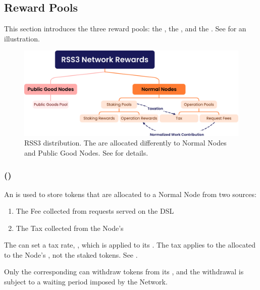 \subsection{Reward Pools}
\label{subsec:reward_pools}

This section introduces the three reward pools: the , the , and the . See  for an illustration.

    {
        \begin{figure}[tb!]
            \centering
            \includegraphics[width=\columnwidth]{figures/network-rewards.png}
            \caption{RSS3  distribution.
                The  are allocated differently to Normal Nodes and Public Good Nodes.
                See  for details.}
            \label{fig:network-rewards}
        \end{figure}
    }

\subsubsection{ (\operationPool)}
\label{subsubsec:operation_pool}

An  is used to store tokens that are allocated to a Normal Node from two sources:
\begin{enumerate}
    \item The \gls{Fee} collected from requests served on the \gls{DSL}
    \item The \gls{Tax} collected from the Node's \stakingPool
\end{enumerate}

The  can set a tax rate, \taxRate, which is applied to its \stakingPool.
The tax applies to the  allocated to the Node's \stakingPool, not the staked tokens. See .

Only the corresponding  can withdraw tokens from its \operationPool, and the withdrawal is subject to a waiting period imposed by the Network.

